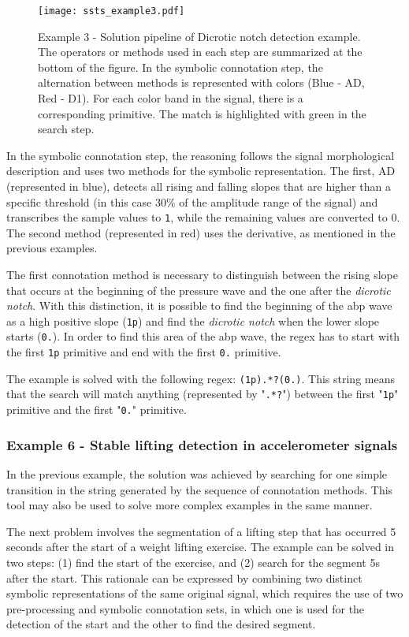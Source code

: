 \begin{figure}
  \centering
      \texttt{[image: ssts\_example3.pdf]}
  \caption{Example 3 - Solution pipeline of Dicrotic notch detection example. The operators or methods used in each step are summarized at the bottom of the figure. In the symbolic connotation step, the alternation between methods is represented with colors (Blue - AD, Red - D1). For each color band in the signal, there is a corresponding primitive. The match is highlighted with green in the search step.}
  \label{fig:Exercise3}
\end{figure}

In the symbolic connotation step, the reasoning follows the signal morphological description and uses two methods for the symbolic representation. The first, AD (represented in blue), detects all rising and falling slopes that are higher than a specific threshold (in this case 30\% of the amplitude range of the signal) and transcribes the sample values to \texttt{1}, while the remaining values are converted to $0$. The second method (represented in red) uses the derivative, as mentioned in the previous examples.
\par
The first connotation method is necessary to distinguish between the rising slope that occurs at the beginning of the pressure wave and the one after the \textit{dicrotic notch}. With this distinction, it is possible to find the beginning of the \gls{abp} wave as a high positive slope (\texttt{1p}) and find the \textit{dicrotic notch} when the lower slope starts (\texttt{0.}). In order to find this area of the \gls{abp} wave, the \gls{regex} has to start with the first \texttt{1p} primitive and end with the first \texttt{0.} primitive. 

\par
The example is solved with the following \gls{regex}: \texttt{(1p).*?(0.)}. This string means that the search will match anything (represented by "\texttt{.*?}") between the first "\texttt{1p}" primitive and the first "\texttt{0.}" primitive.

\subsubsection{Example 6 - Stable lifting detection in accelerometer signals}

In the previous example, the solution was achieved by searching for one simple transition in the string generated by the sequence of connotation methods. This tool may also be used to solve more complex examples in the same manner.
\par
The next problem involves the segmentation of a lifting step that has occurred 5 seconds after the start of a weight lifting exercise. The example can be solved in two steps: (1) find the start of the exercise, and (2) search for the segment 5s after the start. This rationale can be expressed by combining two distinct symbolic representations of the same original signal, which requires the use of two pre-processing and symbolic connotation sets, in which one is used for the detection of the start and the other to find the desired segment.

